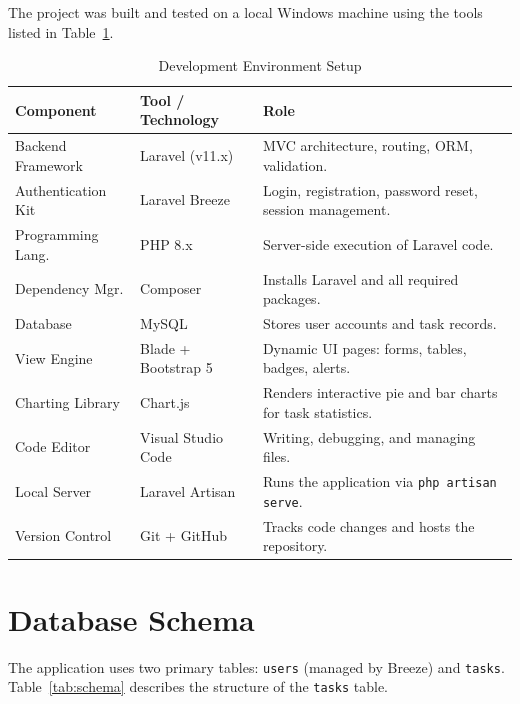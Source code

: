 \documentclass[12pt,a4paper]{report}
\begin{document}
\begin{titlepage}
The project was built and tested on a local Windows machine using the tools listed in
Table~\ref{tab:devenv}.

\begin{table}[h!]
\centering
\caption{Development Environment Setup}
\label{tab:devenv}
\renewcommand{\arraystretch}{1.3}
\begin{tabularx}{\textwidth}{@{}llX@{}}
\toprule
\textbf{Component} & \textbf{Tool / Technology} & \textbf{Role} \\
\midrule
Backend Framework  & Laravel (v11.x)     & MVC architecture, routing, ORM, validation. \\
Authentication Kit & Laravel Breeze      & Login, registration, password reset, session management. \\
Programming Lang.  & PHP 8.x             & Server-side execution of Laravel code. \\
Dependency Mgr.    & Composer            & Installs Laravel and all required packages. \\
Database           & MySQL               & Stores user accounts and task records. \\
View Engine        & Blade + Bootstrap 5 & Dynamic UI pages: forms, tables, badges, alerts. \\
Charting Library   & Chart.js            & Renders interactive pie and bar charts for task statistics. \\
Code Editor        & Visual Studio Code  & Writing, debugging, and managing files. \\
Local Server       & Laravel Artisan     & Runs the application via \texttt{php artisan serve}. \\
Version Control    & Git + GitHub        & Tracks code changes and hosts the repository. \\
\bottomrule
\end{tabularx}
\end{table}

\section{Database Schema}

The application uses two primary tables: \texttt{users} (managed by Breeze) and
\texttt{tasks}. Table~\ref{tab:schema} describes the structure of the \texttt{tasks}
table.


\end{titlepage}
\end{document}
